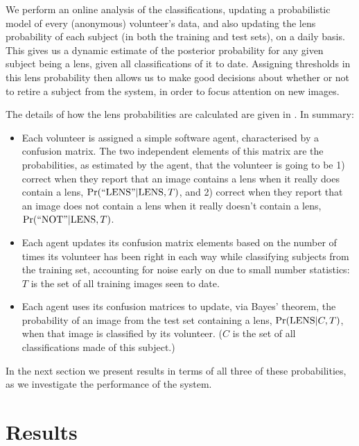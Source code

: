 \documentclass[useAMS,usenatbib,a4paper]{mn2e}
\begin{document}
We perform an online analysis of the classifications,  updating a
probabilistic model of every (anonymous) volunteer's data, and also updating
the lens probability of each subject  (in both the training and test sets), on
a daily basis. This gives us a dynamic estimate of the posterior probability
for  any given  subject being a lens, given all classifications of it to date.
Assigning thresholds in this lens probability then allows us to make good
decisions about whether or not to retire a subject from the system, in order to
focus attention on new images. 

The details of how the lens probabilities are calculated are given in
. In summary:
\begin{itemize}

\item Each volunteer is assigned a simple software agent, characterised by a
confusion matrix. The two independent elements of this matrix are the
probabilities, as estimated by the agent, that the volunteer is going to be 1)
correct when they report that an image contains a lens when it really does
contain a lens, ${\rm Pr}({\rm ``LENS"}|{\rm LENS},T)$, and 2) correct when they report that
an image does not contain a lens when it really doesn't contain a lens,
${\rm Pr}({\rm ``NOT"}|{\rm LENS},T)$.

\item Each agent updates its confusion matrix elements based on the number of
times its volunteer has been right in each way while classifying subjects from
the training set, accounting for noise early on due to small number
statistics: $T$ is the set of all training images seen to date.

\item Each agent uses its confusion matrices to update, via Bayes' theorem,
the probability of an image from the test set containing a lens,
${\rm Pr}({\rm LENS}|C,T)$, when that image is classified by its volunteer. ($C$ is the
set of all classifications made of this subject.)

\end{itemize}

In the next section we present results in terms of all three of these
probabilities, as we investigate the performance of the \SW system.


\section{Results}
\label{sec:results}
\end{document}
